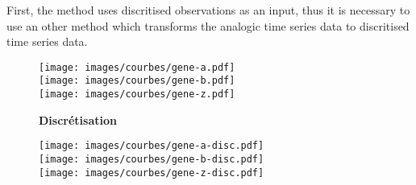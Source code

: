 
First, the method uses discritised observations as an input, thus it is necessary to use an other method which transforms the analogic time series data to discritised time series data.

\begin{figure}
\hspace{-1cm}
\begin{minipage}[t]{0.4\linewidth}
\texttt{[image: images/courbes/gene-a.pdf]}\\
\texttt{[image: images/courbes/gene-b.pdf]}\\
\texttt{[image: images/courbes/gene-z.pdf]}\\
\end{minipage}
\hspace{0.01cm}
\textbf{Discrétisation}
\hspace{0.01cm}
\begin{minipage}[t]{0.4\linewidth}
\centering
\texttt{[image: images/courbes/gene-a-disc.pdf]}\\
\texttt{[image: images/courbes/gene-b-disc.pdf]}\\
\texttt{[image: images/courbes/gene-z-disc.pdf]}\\
\end{minipage}
\end{figure}